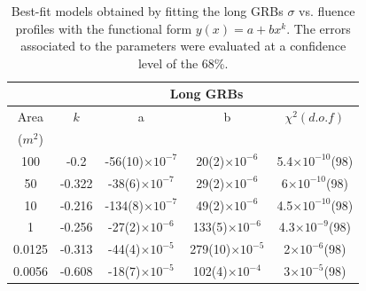 \documentclass[]{spie}  %
\begin{document}
\begin{table}

\footnotesize
\centering
\begin{tabular}{|c|c|c|c|c|}
\hline
\multicolumn{1}{|c|}{    } & \multicolumn{4}{c|}{\textbf{Long GRBs}}  \\
\hline
Area & $k$ & a & b & $\chi^2 (d.o.f)$  \\
($m^2$) &  &  &  &   \\

\hline
100    & -0.2 & -56(10)$\times10^{-7}$ & 20(2)$\times10^{-6}$ & 5.4$\times10^{-10}$(98) \\
50     & -0.322 & -38(6)$\times10^{-7}$ & 29(2)$\times10^{-6}$ & 6$\times10^{-10}$(98) \\
10     & -0.216 & -134(8)$\times10^{-7}$ & 49(2)$\times10^{-6}$ & 4.5$\times10^{-10}$(98) \\
1      & -0.256 & -27(2)$\times10^{-6}$ & 133(5)$\times10^{-6}$ & 4.3$\times10^{-9}$(98) \\
0.0125 & -0.313 & -44(4)$\times10^{-5}$ & 279(10)$\times10^{-5}$ & 2$\times10^{-6}$(98) \\
0.0056 & -0.608 & -18(7)$\times10^{-5}$ & 102(4)$\times10^{-4}$ & 3$\times10^{-5}$(98) \\
\hline
\end{tabular}
\label{tab:fit_sigma_Long}
\caption{Best-fit models obtained by fitting the long GRBs $\sigma$ vs. fluence profiles with the functional form $y(x)=a+bx^k$. The errors associated to the parameters were evaluated at a confidence level of the 68\%.}
\end{table}
\end{document}
